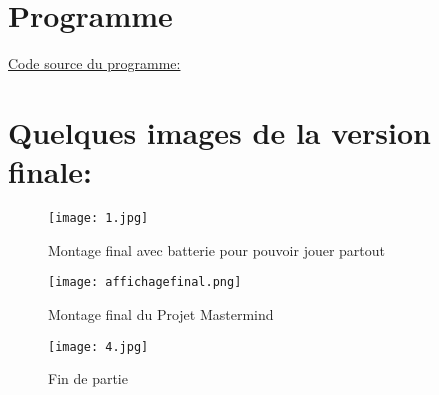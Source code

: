 \newpage
\section{Programme}
\underline{Code source du programme:}


\newpage
\section{Quelques images de la version finale:}
\begin{figure}[h]
	\centering
		\texttt{[image: 1.jpg]}
        \caption{Montage final avec batterie pour pouvoir jouer partout}
\end{figure}

\begin{figure}[h]
	\centering
		\texttt{[image: affichagefinal.png]}
        \caption{Montage final du Projet Mastermind}
\end{figure}

\begin{figure}[h]
	\centering
      \hspace{2mm}
\end{figure}

\begin{figure}[h]
	\centering
		\texttt{[image: 4.jpg]}
        \caption{Fin de partie}
\end{figure}